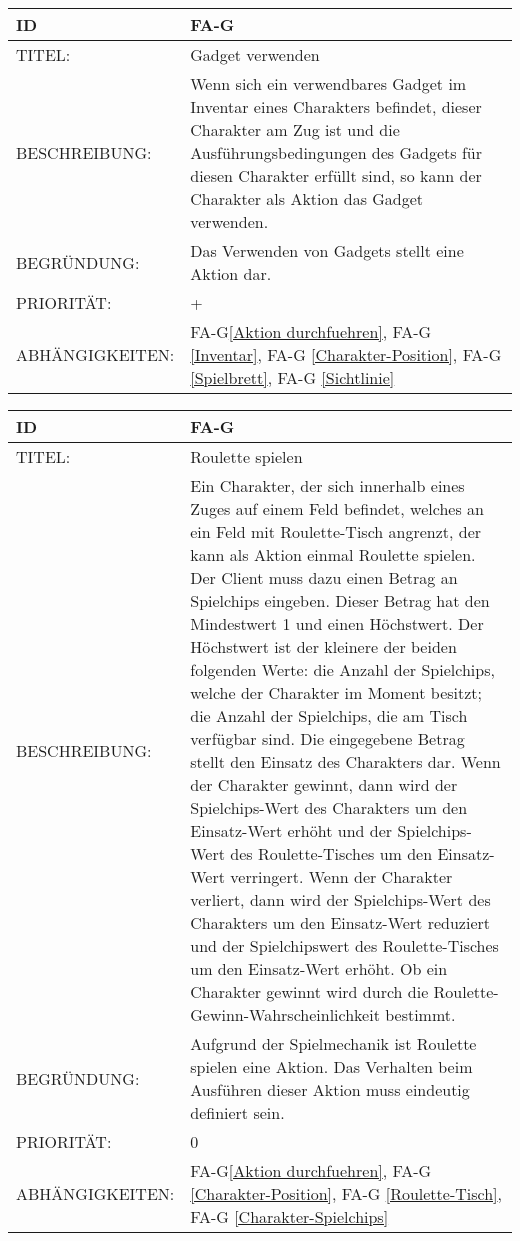 \begin{tabularx}{16cm}{l|X}
	{table}\label{Gadget verwenden}
	\textbf{ID} & \textbf{FA-G\arabic{table}} \\
	\hline
	TITEL: & Gadget verwenden \\
	\hline
	BESCHREIBUNG: & Wenn sich ein verwendbares Gadget im Inventar eines Charakters befindet, dieser Charakter am Zug ist und die Ausführungsbedingungen des Gadgets für diesen Charakter erfüllt sind, so kann der Charakter als Aktion das Gadget verwenden. \\
	 
	\hline
	BEGRÜNDUNG: & Das Verwenden von Gadgets stellt eine Aktion dar.\\
	\hline
	PRIORITÄT: & +\\
	\hline
	ABHÄNGIGKEITEN: & FA-G\ref{Aktion durchfuehren}, FA-G \ref{Inventar}, FA-G \ref{Charakter-Position}, FA-G \ref{Spielbrett}, FA-G \ref{Sichtlinie}  \\
\end{tabularx}

\begin{tabularx}{16cm}{l|X}
	{table}\label{Roulette spielen}
	\textbf{ID} & \textbf{FA-G\arabic{table}} \\
	\hline
	TITEL: & Roulette spielen \\
	\hline
	BESCHREIBUNG: & Ein Charakter, der sich innerhalb eines Zuges auf einem Feld befindet, welches an ein Feld mit Roulette-Tisch angrenzt, der kann als Aktion einmal Roulette spielen. Der Client muss dazu einen Betrag an Spielchips eingeben. Dieser Betrag hat den Mindestwert 1 und einen Höchstwert. Der Höchstwert ist der kleinere der beiden folgenden Werte: die Anzahl der Spielchips, welche der Charakter im Moment besitzt; die Anzahl der Spielchips, die am Tisch verfügbar sind. Die eingegebene Betrag stellt den Einsatz des Charakters dar. Wenn der Charakter gewinnt, dann wird der Spielchips-Wert des Charakters um den Einsatz-Wert erhöht und der Spielchips-Wert des Roulette-Tisches um den Einsatz-Wert verringert. Wenn der Charakter verliert, dann wird der Spielchips-Wert des Charakters um den Einsatz-Wert reduziert und der Spielchipswert des Roulette-Tisches um den Einsatz-Wert erhöht. Ob ein Charakter gewinnt wird durch die Roulette-Gewinn-Wahrscheinlichkeit bestimmt.\\
	\hline
	BEGRÜNDUNG: & Aufgrund der Spielmechanik ist Roulette spielen eine Aktion. Das Verhalten beim Ausführen dieser Aktion muss eindeutig definiert sein.\\
	\hline
	PRIORITÄT: & 0\\
	\hline
	ABHÄNGIGKEITEN: & FA-G\ref{Aktion durchfuehren}, FA-G \ref{Charakter-Position}, FA-G \ref{Roulette-Tisch}, FA-G \ref{Charakter-Spielchips} \\
\end{tabularx}

